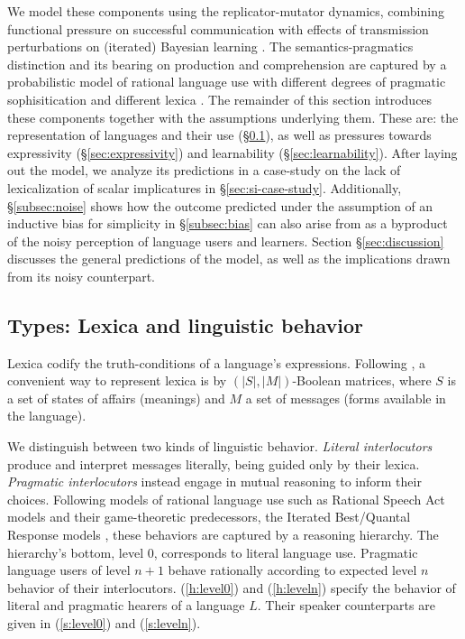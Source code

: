 \documentclass[a4paper]{article}
\begin{document}
We model these components using the replicator-mutator dynamics, combining functional pressure on successful communication with effects of transmission perturbations on (iterated) Bayesian learning \citep{griffiths+kalish:2007}. The semantics-pragmatics distinction and its bearing on production and comprehension are captured by a probabilistic model of rational language use with different degrees of pragmatic sophisitication and different lexica \citep{frank+goodman:2012,franke+jaeger:2014, bergen+etal:2016}. The remainder of this section introduces these components together with the assumptions underlying them. These are: the representation of languages and their use (\S\ref{sec:languages+use}), as well as pressures towards expressivity (\S\ref{sec:expressivity}) and learnability (\S\ref{sec:learnability}). After laying out the model, we analyze its predictions in a case-study on the lack of lexicalization of scalar implicatures in \S\ref{sec:si-case-study}. Additionally, \S\ref{subsec:noise} shows how the outcome predicted under the assumption of an inductive bias for simplicity in \S\ref{subsec:bias} can also arise from as a byproduct of the noisy perception of language users and learners. Section \S\ref{sec:discussion} discusses the general predictions of the model, as well as the implications drawn from its noisy counterpart.




\subsection{Types: Lexica and linguistic behavior}
\label{sec:languages+use}

Lexica codify the truth-conditions of a language's expressions. Following \citet{franke+jaeger:2014}, a convenient way to represent lexica is by $(|S|,|M|)$-Boolean matrices, where $S$ is a set of states of affairs (meanings) and $M$ a set of messages (forms available in the language).

We distinguish between two kinds of linguistic behavior. {\em Literal interlocutors} produce and interpret messages literally, being guided only by their lexica. {\em Pragmatic interlocutors} instead engage in mutual reasoning to inform their choices. Following models of rational language use such as Rational Speech Act models \citep{frank+goodman:2012} and their game-theoretic predecessors, the Iterated Best/Quantal Response models \citep{franke:2009,franke+jaeger:2014}, these behaviors are captured by a reasoning hierarchy. The hierarchy's bottom, level $0$, corresponds to literal language use. Pragmatic language users of level $n + 1$ behave rationally according to expected level $n$ behavior of their interlocutors. (\ref{h:level0}) and (\ref{h:leveln}) specify the behavior of literal and pragmatic hearers of a language $L$. Their speaker counterparts are given in (\ref{s:level0}) and (\ref{s:leveln}).
\end{document}
